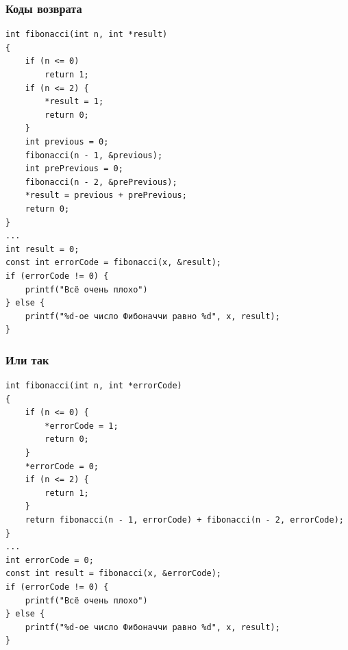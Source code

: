 \documentclass{../../slides-style}
\begin{document}
    
    \begin{frame}[plain]
        \titlepage
    \end{frame}


    \begin{frame}[fragile]
        \frametitle{Коды возврата}
        \begin{scriptsize}
            \begin{verbatim}
int fibonacci(int n, int *result)
{
    if (n <= 0)
        return 1; 
    if (n <= 2) { 
        *result = 1; 
        return 0;
    }
    int previous = 0;
    fibonacci(n - 1, &previous);
    int prePrevious = 0;
    fibonacci(n - 2, &prePrevious);
    *result = previous + prePrevious;
    return 0;
}
...
int result = 0;
const int errorCode = fibonacci(x, &result);
if (errorCode != 0) {
    printf("Всё очень плохо")
} else {
    printf("%d-ое число Фибоначчи равно %d", x, result);
}
            \end{verbatim}
        \end{scriptsize}
    \end{frame}

    \begin{frame}[fragile]
        \frametitle{Или так}
        \begin{scriptsize}
            \begin{verbatim}
int fibonacci(int n, int *errorCode)
{
    if (n <= 0) {
        *errorCode = 1;
        return 0;
    } 
    *errorCode = 0;
    if (n <= 2) { 
        return 1;
    }
    return fibonacci(n - 1, errorCode) + fibonacci(n - 2, errorCode);
}
...
int errorCode = 0;
const int result = fibonacci(x, &errorCode);
if (errorCode != 0) {
    printf("Всё очень плохо")
} else {
    printf("%d-ое число Фибоначчи равно %d", x, result);
}
            \end{verbatim}
        \end{scriptsize}
    \end{frame}
\end{document}
